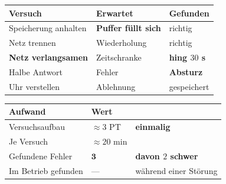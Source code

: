 \begin{aufgabe}
\begin{center}
{\small
\renewcommand{\arraystretch}{1.45}
\begin{tabular}{@{}P{2.8cm}P{2.4cm}P{2.6cm}@{}}
\toprule
\textbf{Versuch} & \textbf{Erwartet} & \textbf{Gefunden}\\
\midrule
Speicherung anhalten & \textbf{Puffer füllt sich} & \textcolor{gruen}{richtig}\\
Netz trennen & Wiederholung & \textcolor{gruen}{richtig}\\
\textbf{Netz verlangsamen} & Zeitschranke & \textcolor{akzent}{\textbf{hing $30$ s}}\\
Halbe Antwort & Fehler & \textcolor{akzent}{\textbf{Absturz}}\\
Uhr verstellen & Ablehnung & \textcolor{akzent}{gespeichert}\\
\bottomrule
\end{tabular}}
\end{center}

\begin{center}
\begin{minipage}{0.88\textwidth}
\end{minipage}
\end{center}

\begin{center}
\end{center}

\begin{center}
\renewcommand{\arraystretch}{1.45}
\begin{tabular}{@{}P{3.0cm}P{2.2cm}P{2.8cm}@{}}
\toprule
\textbf{Aufwand} & \textbf{Wert} & \\
\midrule
Versuchsaufbau & $\approx3$ PT & \textbf{einmalig}\\
Je Versuch & $\approx20$ min & \\
Gefundene Fehler & $\mathbf{3}$ & \textcolor{gruen}{\textbf{davon $2$ schwer}}\\
Im Betrieb gefunden & --- & \textcolor{akzent}{während einer Störung}\\
\bottomrule
\end{tabular}
\end{center}


\end{aufgabe}
